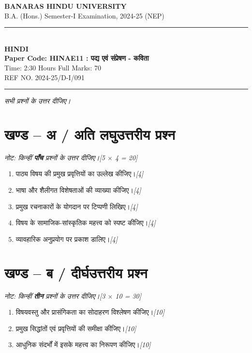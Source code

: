 \documentclass[11pt,a4paper]{article}
\newcommand{\pts}[1]{\hfill \textit{[#1]}}
\begin{document}
\begin{center}
  {\large\bfseries BANARAS HINDU UNIVERSITY}\\[2pt]
  {\normalsize B.A. (Hons.) Semester-I Examination, 2024-25 (NEP)}\\[6pt]
  \rule{0.8\linewidth}{0.5pt}\\[6pt]
  {\large\bfseries HINDI}\\[4pt]
  {\large\bfseries Paper Code: HINAE11 : पद्य एवं संप्रेषण - कविता}\\[4pt]
  {\normalsize Time: 2:30 Hours \hfill Full Marks: 70}\\[2pt]
  {\small REF NO. 2024-25/D-I/091}
\end{center}
\rule{\linewidth}{0.4pt}
\smallskip


\noindent \textit{सभी प्रश्नों के उत्तर दीजिए।}

\bigskip

\section*{खण्ड -- अ / अति लघुउत्तरीय प्रश्न}
\noindent \textit{नोट: किन्हीं \textbf{पाँच} प्रश्नों के उत्तर दीजिए।}\pts{5 $\times$ 4 = 20}

\begin{enumerate}[label=\textbf{(\ क\ )},leftmargin=*,itemsep=6pt]
  \item[\textbf{(क)}] पाठ्य विषय की प्रमुख प्रवृत्तियों का उल्लेख कीजिए।\pts{4}
  \item[\textbf{(ख)}] भाषा और शैलीगत विशेषताओं की व्याख्या कीजिए।\pts{4}
  \item[\textbf{(ग)}] प्रमुख रचनाकारों के योगदान पर टिप्पणी लिखिए।\pts{4}
  \item[\textbf{(घ)}] विषय के सामाजिक-सांस्कृतिक महत्त्व को स्पष्ट कीजिए।\pts{4}
  \item[\textbf{(ङ)}] व्यावहारिक अनुप्रयोग पर प्रकाश डालिए।\pts{4}
\end{enumerate}

\bigskip

\section*{खण्ड -- ब / दीर्घउत्तरीय प्रश्न}
\noindent \textit{नोट: किन्हीं \textbf{तीन} प्रश्नों के उत्तर दीजिए।}\pts{3 $\times$ 10 = 30}

\begin{enumerate}[label=\textbf{\arabic*.},leftmargin=*,itemsep=12pt]
  \item विषयवस्तु और प्रासंगिकता का सोदाहरण विश्लेषण कीजिए।\pts{10}
  \item प्रमुख सिद्धांतों एवं प्रवृत्तियों की समीक्षा कीजिए।\pts{10}
  \item आधुनिक संदर्भों में इसके महत्त्व का निरूपण कीजिए।\pts{10}
\end{enumerate}
\end{document}
